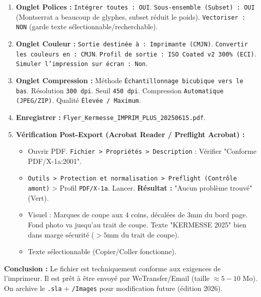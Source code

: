 \documentclass[11pt]{article}
\begin{document}
\begin{exoresolu}
\begin{enumerate}
\begin{itemize}
                        \item \texttt{Options} : Décocher \texttt{Inclure les annotations}, \texttt{Inclure les formulaires}.
                    \end{itemize}
              \item \textbf{Onglet Polices :} \texttt{Intégrer toutes : OUI}. \texttt{Sous-ensemble (Subset) : OUI} (Montserrat a beaucoup de glyphes, subset réduit le poids). \texttt{Vectoriser : NON} (garde texte sélectionnable/recherchable).
              \item \textbf{Onglet Couleur :} \texttt{Sortie destinée à : Imprimante (CMJN)}. \texttt{Convertir les couleurs en : CMJN}. \texttt{Profil de sortie : ISO Coated v2 300\% (ECI)}. \texttt{Simuler l'impression sur écran : Non}.
              \item \textbf{Onglet Compression :} Méthode \texttt{Échantillonnage bicubique vers le bas}. Résolution \texttt{300 dpi}. Seuil \texttt{450 dpi}. Compression \texttt{Automatique (JPEG/ZIP)}. Qualité \texttt{Élevée / Maximum}.
              \item \textbf{Enregistrer :} \texttt{Flyer\_Kermesse\_IMPRIM\_PLUS\_20250615.pdf}.
        \item \textbf{Vérification Post-Export (Acrobat Reader / Preflight Acrobat) :}
              \begin{itemize}
                  \item Ouvrir PDF. \texttt{Fichier > Propriétés > Description} : Vérifier "Conforme PDF/X-1a:2001".
                  \item \texttt{Outils > Protection et normalisation > Preflight (Contrôle amont)} > Profil \texttt{PDF/X-1a}. Lancer. \textbf{Résultat :} "Aucun problème trouvé" (Vert).
                  \item Visuel : Marques de coupe aux 4 coins, décalées de 3mm du bord page. Fond photo va jusqu'au trait de coupe. Texte "KERMESSE 2025" bien dans marge sécurité ($>5$mm du trait de coupe).
                  \item Texte sélectionnable (Copier/Coller fonctionne).
              \end{itemize}
    \end{enumerate}
    \textbf{Conclusion :} Le fichier est techniquement conforme aux exigences de l'imprimeur. Il est prêt à être envoyé par WeTransfer/Email (taille $\approx 5-10$ Mo). On archive le \texttt{.sla} + \texttt{/Images} pour modification future (édition 2026).
\end{exoresolu}
\end{document}
